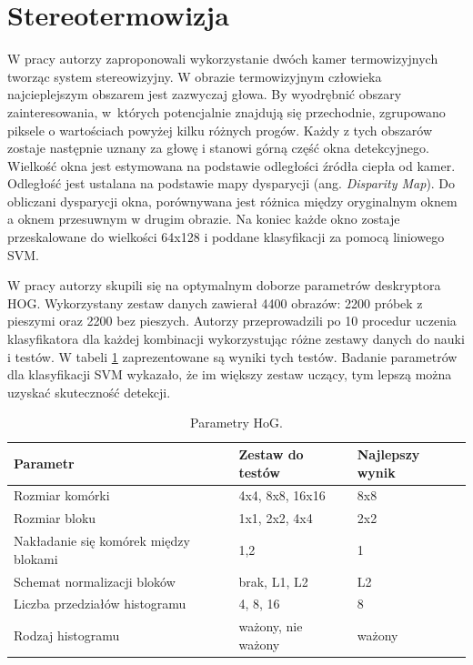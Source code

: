 \section{Stereotermowizja}
W pracy \cite{suard2006pedestrian} autorzy zaproponowali wykorzystanie dwóch kamer termowizyjnych tworząc system stereowizyjny. W obrazie termowizyjnym człowieka najcieplejszym obszarem jest zazwyczaj głowa. By wyodrębnić obszary zainteresowania, w~których potencjalnie znajdują się przechodnie, zgrupowano piksele o wartościach powyżej kilku różnych progów. Każdy z tych obszarów zostaje następnie uznany za głowę i stanowi górną część okna detekcyjnego. Wielkość okna jest estymowana na podstawie odległości źródła ciepła od kamer. Odległość jest ustalana na podstawie mapy dysparycji (ang. \textit{Disparity Map}). Do obliczani dysparycji okna, porównywana jest różnica między oryginalnym oknem a oknem przesuwnym w drugim obrazie. Na koniec każde okno zostaje przeskalowane do wielkości 64x128 i poddane klasyfikacji za pomocą liniowego SVM. %

W pracy autorzy skupili się na optymalnym doborze parametrów deskryptora HOG. Wykorzystany zestaw danych zawierał 4400 obrazów: 2200 próbek z pieszymi oraz 2200 bez pieszych. Autorzy przeprowadzili po 10 procedur uczenia klasyfikatora dla każdej kombinacji wykorzystując różne zestawy danych do nauki i testów. W tabeli \ref{tab:parametryhog} zaprezentowane są wyniki tych testów. Badanie parametrów dla klasyfikacji SVM wykazało, że im większy zestaw uczący, tym lepszą można uzyskać skuteczność detekcji.

\begin{table}[!h]
\centering
\begin{threeparttable}
\caption{Parametry HoG.}
\label{tab:parametryhog}
\begin{tabularx}{1\textwidth}{|l|X|X|}

\hline Parametr & Zestaw do testów & Najlepszy wynik \\
\hline Rozmiar komórki & 4x4, 8x8, 16x16 & 8x8 \\
\hline Rozmiar bloku & 1x1, 2x2, 4x4 & 2x2 \\
\hline Nakładanie się komórek między blokami & 1,2 & 1 \\
\hline Schemat normalizacji bloków & brak, L1, L2 & L2 \\
\hline Liczba przedziałów histogramu & 4, 8, 16 & 8 \\
\hline Rodzaj histogramu & ważony, nie ważony & ważony \\
\hline

\end{tabularx}
\end{threeparttable}
\end{table}




